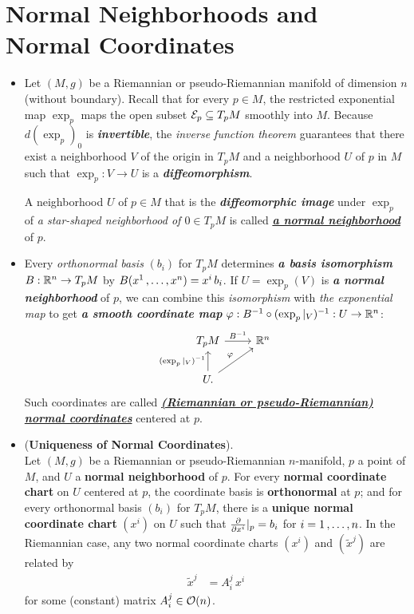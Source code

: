 \documentclass[11pt]{article}
\begin{document}
\section{Normal Neighborhoods and Normal Coordinates}
\begin{itemize}
\item \begin{definition}
Let $(M, g)$ be a Riemannian or pseudo-Riemannian manifold of dimension $n$ (without boundary). Recall that for every $p \in M$, the restricted exponential map $\exp_p$ maps the open subset ${\mathcal E}_p \subseteq T_{p}M$ smoothly into $M$. Because $d(\exp_p)_0$ is \emph{\textbf{invertible}}, the \emph{inverse function theorem} guarantees that there exist a neighborhood $V$ of the origin in $T_{p}M$ and a neighborhood $U$ of $p$ in $M$ such that $\exp_p: V \rightarrow U$ is a \emph{\textbf{diffeomorphism}}. 

A neighborhood $U$ of $p \in M$ that is the \emph{\textbf{diffeomorphic image}} under $\exp_p$ of \emph{a star-shaped neighborhood of $0 \in T_{p}M$} is called \underline{\emph{\textbf{a normal neighborhood}}} of $p$.
\end{definition}

\item \begin{definition}
Every \emph{orthonormal basis} $(b_i)$ for $T_{p}M$ determines \emph{\textbf{a basis isomorphism}} $B: {\mathbb R}^n \rightarrow T_{p}M$ by $B(x^1 \,{,}\ldots{,}\, x^n) = x^i\,b_i$. If $U = \exp_{p}(V)$ is \emph{\textbf{a normal neighborhood}} of $p$, we can combine this \emph{isomorphism} with \emph{the exponential map} to get \emph{\textbf{a smooth coordinate map}} $\varphi: B^{-1} \circ (\exp_p|_{V})^{-1}: U \rightarrow {\mathbb R}^n$:
\[
  \begin{tikzcd}
   T_{p}M  \arrow{r}{B^{-1}} & \bR^{n} \\
    U. \arrow{u}{(\exp_p|_{V})^{-1}} \arrow{ur}{\varphi} & 
  \end{tikzcd}
\] 
Such coordinates are called \underline{\emph{\textbf{(Riemannian or pseudo-Riemannian) normal coordinates}}} centered at $p$.
\end{definition}

\item \begin{proposition} (\textbf{Uniqueness of Normal Coordinates}). \citep{lee2018introduction} \\
Let $(M, g)$ be a Riemannian or pseudo-Riemannian $n$-manifold, $p$ a point of $M$, and $U$ a \textbf{normal neighborhood} of $p$. For every \textbf{normal coordinate chart} on $U$ centered at $p$, the coordinate basis is \textbf{orthonormal} at $p$; and for every orthonormal basis $(b_i)$ for $T_{p}M$, there is a \textbf{unique normal coordinate chart} $(x^i)$ on $U$ such that $\frac{\partial }{ \partial x^i}|_{p} = b_i$ for $i = 1 \,{,}\ldots{,}\, n$. In the Riemannian case, any two normal coordinate charts $(x^i)$ and $(\widetilde{x}^j)$ are related by
\begin{align}
\widetilde{x}^j &= A_i^j \,x^i  \label{eqn: normal_coordinate_change_of_coordinate}
\end{align} for some (constant) matrix $A_{i}^{j} \in {\mathcal O}(n)$.
\end{proposition}


\end{itemize}
\end{document}
